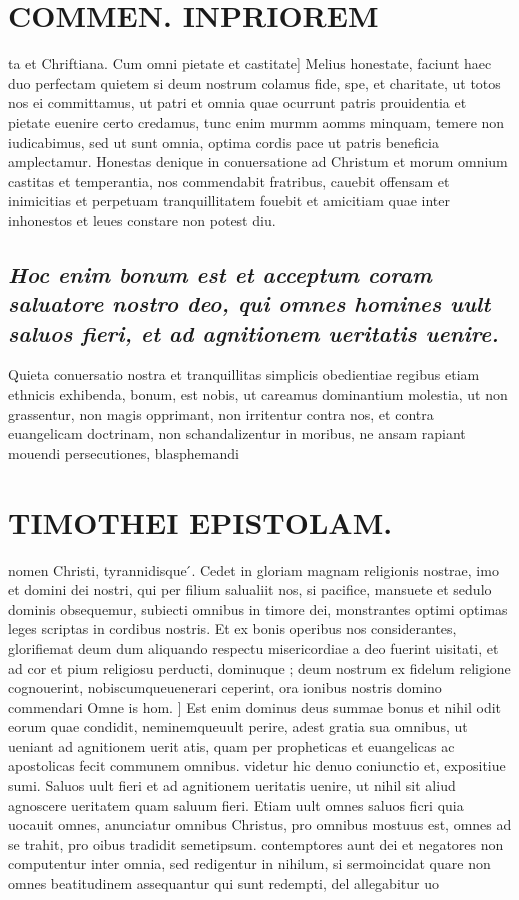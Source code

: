\documentclass{article}
\begin{document}
\begin{pages}
\section*{COMMEN. INPRIOREM }
\marginpar{[ p.46 ]}\pstart ta et Chriftiana.  \pend\pstart Cum omni pietate et castitate] Melius honestate, faciunt haec duo perfectam quietem si deum nostrum colamus fide, spe, et charitate, ut totos nos ei committamus, ut patri et omnia quae ocurrunt patris prouidentia et pietate euenire certo credamus, tunc enim murmm aomms minquam, temere non iudicabimus, sed ut sunt omnia, optima cordis pace ut patris beneficia amplectamur.  \pend\pstart Honestas denique  in conuersatione ad Christum et morum omnium castitas et temperantia, nos commendabit fratribus, cauebit offensam et inimicitias et perpetuam tranquillitatem fouebit et amicitiam quae inter inhonestos et leues constare non potest diu.  \pend
{}
{}
\subsection*{\textit{Hoc enim bonum est et acceptum coram saluatore nostro deo, qui omnes homines uult saluos fieri, et ad agnitionem ueritatis uenire. }}\pstart Quieta conuersatio nostra et tranquillitas simplicis obedientiae regibus etiam ethnicis exhibenda, bonum, est nobis, ut careamus dominantium molestia, ut non grassentur, non magis opprimant, non irritentur contra nos, et contra euangelicam doctrinam, non schandalizentur in moribus, ne ansam rapiant mouendi persecutiones, blasphemandi  \pend
\section*{TIMOTHEI EPISTOLAM. }
\marginpar{[ p.47 ]}\pstart nomen Christi, tyrannidisque ́.  \pend\pstart Cedet in gloriam magnam religionis nostrae, imo et domini dei nostri, qui per filium salualiit nos, si pacifice, mansuete et sedulo dominis obsequemur, subiecti omnibus in timore dei, monstrantes optimi optimas leges scriptas in cordibus nostris. Et ex bonis operibus nos considerantes, glorifiemat deum dum aliquando respectu misericordiae a deo fuerint uisitati, et ad cor et pium religiosu perducti, dominuque ; deum nostrum ex fidelum religione cognouerint, nobiscumqueuenerari ceperint, ora ionibus nostris domino commendari  \pend\pstart Omne is hom. ] Est enim dominus deus summae bonus et nihil odit eorum quae condidit, neminemqueuult perire, adest gratia sua omnibus, ut ueniant ad agnitionem uerit atis, quam per propheticas et euangelicas ac apostolicas fecit communem omnibus. videtur hic denuo coniunctio et, expositiue sumi. Saluos uult fieri et ad agnitionem ueritatis uenire, ut nihil sit aliud agnoscere ueritatem quam saluum fieri. Etiam uult omnes saluos ficri quia uocauit omnes, anunciatur omnibus Christus, pro omnibus mostuus est, omnes ad se trahit, pro oibus tradidit semetipsum. contemptores aunt dei et negatores non computentur inter omnia, sed redigentur in nihilum, si sermoincidat quare non omnes beatitudinem assequantur qui sunt redempti, del allegabitur uo\pend

\end{pages}
\end{document}
